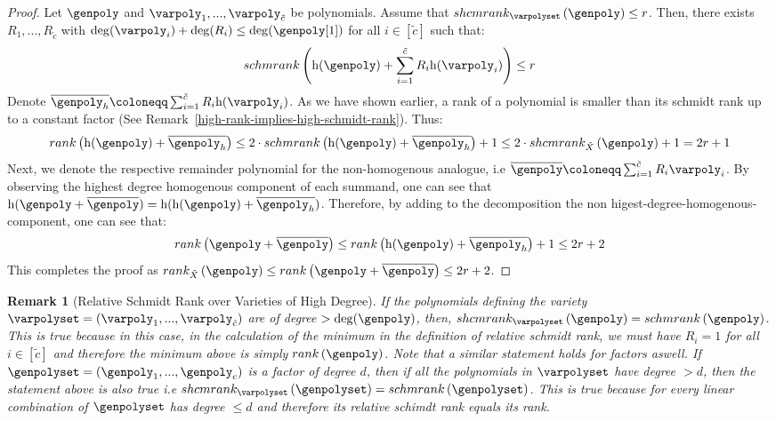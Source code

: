 \documentclass[10pt,a4paper]{article}
\newtheorem{remark}[theorem]{Remark}
\newcommand{\definedas}[0]{\coloneqq}
\newcommand{\parens}[1]{\left( #1 \right)}
\newcommand{\sparens}[1]{\left[ #1 \right]}
\newcommand{\degree}[0]{d}
\newcommand{\relativeremainder}[1]{\overline{#1}}
\newcommand{\remainderpoly}[0]{R}
\newcommand{\variety}{{\tilde{X}}}
\newcommand{\varietypolycount}{{\tilde{c}}}
\newcommand{\homopart}[1]{\mathrm{h}({#1})}
\newcommand{\rank}[1]{rank \parens{#1}}
\newcommand{\schmrank}[1]{schmrank \parens{#1}}
\newcommand{\relschmrank}[2]{shcmrank_{#1}\parens{{#2}}}
\newcommand{\relrank}[2]{rank_{#1} \parens{#2}}
\newcommand{\rankval}[0]{{{r}}}
\begin{document}
\begin{proof}
    Let $\genpoly$ and $\varpoly_1,...,\varpoly_{\varietypolycount}$ be polynomials.
    Assume that $\relschmrank{\varpolyset}{\genpoly} \leq \rankval$.
    Then, there exists $\remainderpoly_1,...,\remainderpoly_\varietypolycount$ with
    $\deg(\varpoly_{i})+\deg(\remainderpoly_{i}) \leq \deg(\genpoly[1])$ for all $i \in \sparens{\varietypolycount}$
    such that:
    \[
        \schmrank{\homopart{\genpoly} + \sum_{i=1}^{\varietypolycount}{\remainderpoly_i \homopart{\varpoly_i}}} \leq \rankval
    \]
    Denote $\relativeremainder{\genpoly_h} \definedas \sum_{i=1}^{\varietypolycount}{\remainderpoly_i \homopart{\varpoly_i}}$.
    As we have shown earlier, a rank of a polynomial is smaller than its schmidt rank up to a constant factor (See Remark~\ref{high-rank-implies-high-schmidt-rank}).
    Thus:
    \[
        \rank{\homopart{\genpoly} + \relativeremainder{\genpoly_h}} \leq
        2 \cdot \schmrank{\homopart{\genpoly} + \relativeremainder{\genpoly_h}} + 1 \leq
        2 \cdot \relschmrank{\variety}{\genpoly} + 1 =
        2 \rankval + 1
    \]
    Next, we denote the respective remainder polynomial for the non-homogenous analogue, i.e $\relativeremainder{\genpoly} \definedas \sum_{i=1}^{\varietypolycount}{\remainderpoly_i \varpoly_i}$.
    By observing the highest degree homogenous component of each summand, one can see that $\homopart{\genpoly + \relativeremainder{\genpoly}} = \homopart{\homopart{\genpoly} + \relativeremainder{\genpoly_h}}$.
    Therefore, by adding to the decomposition the non higest-degree-homogenous-component, one can see that:
    \[
        \rank{\genpoly + \relativeremainder{\genpoly}} \leq
        \rank{\homopart{\genpoly} + \relativeremainder{\genpoly_h}} + 1 \leq
        2 \rankval + 2
    \]
    This completes the proof as $\relrank{\variety}{\genpoly} \leq \rank{\genpoly + \relativeremainder{\genpoly}} \leq 2 \rankval + 2$.
\end{proof}

\begin{remark}[Relative Schmidt Rank over Varieties of High Degree]\label{relative-schimdt-rank-equals-schmidt-rank-if-the-variety-is-of-high-degree}
If the polynomials defining the variety $\varpolyset = (\varpoly_1,...,\varpoly_{\varietypolycount})$ are of degree $> \deg(\genpoly)$,
then, $\relschmrank{\varpolyset}{\genpoly} = \schmrank{\genpoly}$.
This is true because in this case, in the calculation of the minimum in the definition of relative schmidt rank, we must have $\remainderpoly_i = 1$ for all $i \in [\varietypolycount]$ and therefore the minimum above is simply $\rank{\genpoly}$.
\newline
Note that a similar statement holds for factors aswell.
If $\genpolyset = (\genpoly_1,...,\genpoly_c)$ is a factor of degree $\degree$, then if all the polynomials in $\varpolyset$ have degree $> \degree$, then the statement above is also true i.e $\relschmrank{\varpolyset}{\genpolyset} = \schmrank{\genpolyset}$.
This is true because for every linear combination of $\genpolyset$ has degree $\leq \degree$ and therefore its relative schimdt rank equals its rank.
\end{remark}
\end{document}
